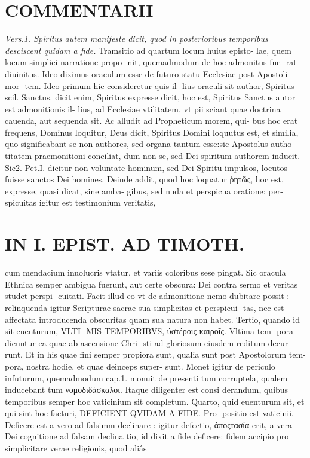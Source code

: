 \documentclass{article}
\begin{document}
\begin{pages}
\section*{COMMENTARII }
\marginpar{[ p.84 ]}
\textit{Vers.1. Spiritus autem manifeste dicit, quod in posterioribus temporibus desciscent quidam a fide. }\pstart Tramsitio ad quartum locum huius episto- lae, quem locum simplici narratione propo- nit, quemadmodum de hoc admonitus fue- rat diuinitus. Ideo diximus oraculum esse de futuro statu Ecclesiae post Apostoli mor- tem. Ideo primum hic consideretur quis il- lius oraculi sit author, Spiritus scil. Sanctus. dicit enim, Spiritus expresse dicit, hoc est, Spiritus Sanctus autor est admonitionis il- lius, ad Ecclesiae vtilitatem, vt pii sciant quae doctrina cauenda, aut sequenda sit.  \pend\pstart Ac alludit ad Propheticum morem, qui- bus hoc erat frequens, Dominus loquitur, Deus dicit, Spiritus Domini loquutus est, et similia, quo significabant se non authores, sed organa tantum esse:sic Apostolus autho- titatem praemonitioni conciliat, dum non se, sed Dei spiritum authorem inducit. Sic2. Pet.I. dicitur non voluntate hominum, sed Dei Spiritu impulsos, locutos fuisse sanctos Dei homines.  \pend\pstart Deinde addit, quod hoc loquatur ῥητῶς, hoc est, expresse, quasi dicat, sine amba- gibus, sed nuda et perspicua oratione: per- spicuitas igitur est testimonium veritatis,  \pend
\section*{IN I. EPIST. AD TIMOTH. }
\marginpar{[ p.85 ]}\pstart cum mendacium inuolucris vtatur, et variis coloribus sese pingat. Sic oracula Ethnica semper ambigua fuerunt, aut certe obscura: Dei contra sermo et veritas studet perspi- cuitati. Facit illud eo vt de admonitione nemo dubitare possit : relinquenda igitur Scripturae sacrae sua simplicitas et perspicui- tas, nec est affectata introducenda obscuritas quam sua natura non habet.  \pend\pstart Tertio, quando id sit euenturum, VLTI- MIS TEMPORIBVS, ύστέροις καιροῖς. Vltima tem- pora dicuntur ea quae ab ascensione Chri- sti ad gloriosum eiusdem reditum decur- runt. Et in his quae fini semper propiora sunt, qualia sunt post Apostolorum tem- pora, nostra hodie, et quae deinceps super- sunt. Monet igitur de periculo infuturum, quemadmodum cap.1. monuit de presenti tum corruptela, qualem inducebant tum νομοδιδάσκαλοι. Itaque diligenter est consi derandum, quibus temporibus semper hoc vaticinium sit completum.  \pend\pstart Quarto, quid euenturum sit, et qui sint hoc facturi, DEFICIENT QVIDAM A FIDE. Pro- positio est vaticinii. Deficere est a vero ad falsimm declinare : igitur defectio, ἀποςτασία erit, a vera Dei cognitione ad falsam declina tio, id dixit a fide deficere: fidem accipio pro simplicitare verae religionis, quod aliâs  \pend

\end{pages}
\end{document}
